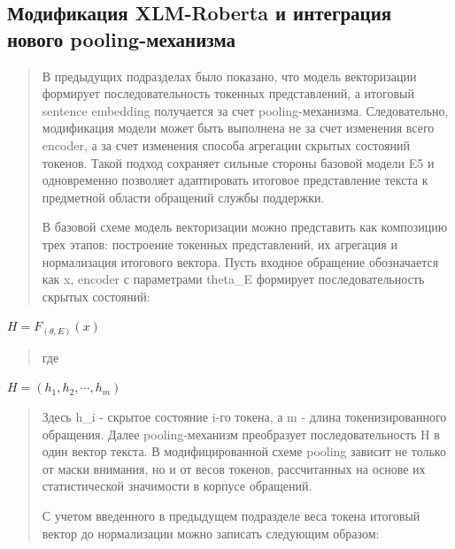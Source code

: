 \documentclass[
]{article}
\begin{document}
\hypertarget{ux43cux43eux434ux438ux444ux438ux43aux430ux446ux438ux44f-xlm-roberta-ux438-ux438ux43dux442ux435ux433ux440ux430ux446ux438ux44f-ux43dux43eux432ux43eux433ux43e-pooling-ux43cux435ux445ux430ux43dux438ux437ux43cux430}{%
\subsection{Модификация XLM-Roberta и интеграция нового
pooling-механизма}\label{ux43cux43eux434ux438ux444ux438ux43aux430ux446ux438ux44f-xlm-roberta-ux438-ux438ux43dux442ux435ux433ux440ux430ux446ux438ux44f-ux43dux43eux432ux43eux433ux43e-pooling-ux43cux435ux445ux430ux43dux438ux437ux43cux430}}

\begin{quote}
В предыдущих подразделах было показано, что модель векторизации
формирует последовательность токенных представлений, а итоговый sentence
embedding получается за счет pooling-механизма. Следовательно,
модификация модели может быть выполнена не за счет изменения всего
encoder, а за счет изменения способа агрегации скрытых состояний
токенов. Такой подход сохраняет сильные стороны базовой модели E5 и
одновременно позволяет адаптировать итоговое представление текста к
предметной области обращений службы поддержки.

В базовой схеме модель векторизации можно представить как композицию
трех этапов: построение токенных представлений, их агрегация и
нормализация итогового вектора. Пусть входное обращение обозначается как
x, encoder с параметрами theta\_E формирует последовательность скрытых
состояний:
\end{quote}

\(H = F_{(\theta,E)}(x)\)

\begin{quote}
где
\end{quote}

\(H = \left( h_{1},h_{2},\cdots,h_{m} \right)\)

\begin{quote}
Здесь h\_i - скрытое состояние i-го токена, а m - длина
токенизированного обращения. Далее pooling-механизм преобразует
последовательность H в один вектор текста. В модифицированной схеме
pooling зависит не только от маски внимания, но и от весов токенов,
рассчитанных на основе их статистической значимости в корпусе обращений.

С учетом введенного в предыдущем подразделе веса токена итоговый вектор
до нормализации можно записать следующим образом:
\end{quote}
\end{document}
